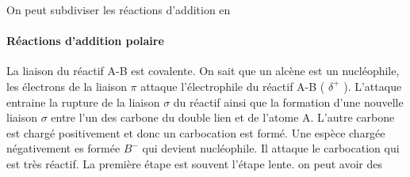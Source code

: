On peut subdiviser les réactions d'addition en

\paragraph{Réactions d'addition polaire}

La liaison du réactif A-B est covalente.
On sait que un alcène est un nucléophile, les électrons de la liaison $\pi$ attaque l'électrophile du réactif A-B ( $\delta^+$ ).
L'attaque entraine la rupture de la liaison $\sigma$ du réactif ainsi que la formation d'une nouvelle liaison $\sigma$ entre l'un des carbone du double lien et de l'atome A.
L'autre carbone est chargé positivement et donc un carbocation est formé.
Une espèce chargée négativement es formée $B^-$ qui devient nucléophile.
Il attaque le carbocation qui est très réactif.
La première étape est souvent l'étape lente.
on peut avoir des
